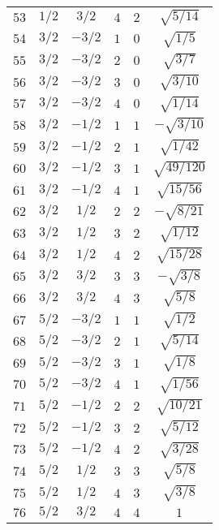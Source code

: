 \begin{table}
\begin{center}
\begin{tabular}{|c|c|c|c|c|c|}
$53$ & $1/2$ & $3/2$ & $4$ & $2$ & $\sqrt{5/14}$ \\ 
$54$ & $3/2$ & $-3/2$ & $1$ & $0$ & $\sqrt{1/5}$ \\ 
$55$ & $3/2$ & $-3/2$ & $2$ & $0$ & $\sqrt{3/7}$ \\ 
$56$ & $3/2$ & $-3/2$ & $3$ & $0$ & $\sqrt{3/10}$ \\ 
$57$ & $3/2$ & $-3/2$ & $4$ & $0$ & $\sqrt{1/14}$ \\ 
$58$ & $3/2$ & $-1/2$ & $1$ & $1$ & $-\sqrt{3/10}$ \\ 
$59$ & $3/2$ & $-1/2$ & $2$ & $1$ & $\sqrt{1/42}$ \\ 
$60$ & $3/2$ & $-1/2$ & $3$ & $1$ & $\sqrt{49/120}$ \\ 
$61$ & $3/2$ & $-1/2$ & $4$ & $1$ & $\sqrt{15/56}$ \\ 
$62$ & $3/2$ & $1/2$ & $2$ & $2$ & $-\sqrt{8/21}$ \\ 
$63$ & $3/2$ & $1/2$ & $3$ & $2$ & $\sqrt{1/12}$ \\ 
$64$ & $3/2$ & $1/2$ & $4$ & $2$ & $\sqrt{15/28}$ \\ 
$65$ & $3/2$ & $3/2$ & $3$ & $3$ & $-\sqrt{3/8}$ \\ 
$66$ & $3/2$ & $3/2$ & $4$ & $3$ & $\sqrt{5/8}$ \\ 
$67$ & $5/2$ & $-3/2$ & $1$ & $1$ & $\sqrt{1/2}$ \\ 
$68$ & $5/2$ & $-3/2$ & $2$ & $1$ & $\sqrt{5/14}$ \\ 
$69$ & $5/2$ & $-3/2$ & $3$ & $1$ & $\sqrt{1/8}$ \\ 
$70$ & $5/2$ & $-3/2$ & $4$ & $1$ & $\sqrt{1/56}$ \\ 
$71$ & $5/2$ & $-1/2$ & $2$ & $2$ & $\sqrt{10/21}$ \\ 
$72$ & $5/2$ & $-1/2$ & $3$ & $2$ & $\sqrt{5/12}$ \\ 
$73$ & $5/2$ & $-1/2$ & $4$ & $2$ & $\sqrt{3/28}$ \\ 
$74$ & $5/2$ & $1/2$ & $3$ & $3$ & $\sqrt{5/8}$ \\ 
$75$ & $5/2$ & $1/2$ & $4$ & $3$ & $\sqrt{3/8}$ \\ 
$76$ & $5/2$ & $3/2$ & $4$ & $4$ & $1$ \\ 
\hline 
\end{tabular}
\end{center}
\end{table}

